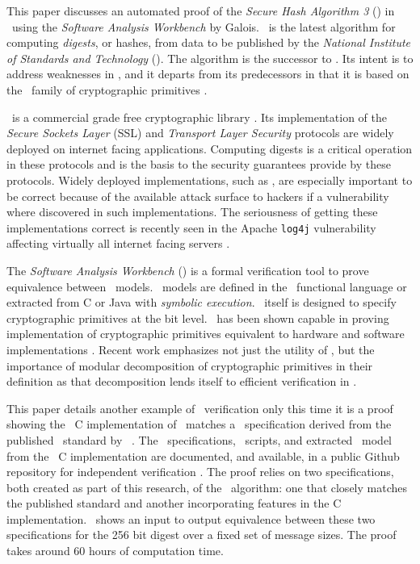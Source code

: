 This paper discusses an automated proof of the \emph{Secure Hash Algorithm 3} (\shaThree) in \openssl\ using the \emph{Software Analysis Workbench} by Galois.
\shaThree\ is the latest algorithm for computing \emph{digests}, or hashes, from data to be published by the \emph{National Institute of Standards and Technology} (\nist).
The algorithm is the successor to \shaTwo.
Its intent is to address weaknesses in \shaTwo, and it departs from its predecessors in that it is based on the \keccak\ family of cryptographic primitives \cite{fips202}.

\openssl\ is a commercial grade free cryptographic library \cite{openssl}.
Its implementation of the \emph{Secure Sockets Layer} (SSL) and \emph{Transport Layer Security} protocols are widely deployed on internet facing applications.
Computing digests is a critical operation in these protocols and is the basis to the security guarantees provide by these protocols.
Widely deployed implementations, such as \openssl, are especially important to be correct because of the available attack surface to hackers if a vulnerability where discovered in such implementations.
The seriousness of getting these implementations correct is recently seen in the Apache \texttt{log4j} vulnerability affecting virtually all internet facing servers \cite{log4j}.

The \emph{Software Analysis Workbench} (\saw) is a formal verification tool to prove equivalence between \sawcore\ models. \sawcore\ models are defined in the \cryptol\ functional language or extracted from C or Java with \emph{symbolic execution}.
\cryptol\ itself is designed to specify cryptographic primitives at the bit level.
\saw\ has been shown capable in proving implementation of cryptographic primitives equivalent to hardware and software implementations \cite{crypt-hi,hard-soft,design-verif}.
Recent work emphasizes not just the utility of \saw, but the importance of modular decomposition of cryptographic primitives in their definition as that decomposition lends itself to efficient verification in \saw \cite{nfm-us}. 

This paper details another example of \saw\ verification only this time it is a proof showing the \openssl\ C implementation of \shaThree\ matches a \cryptol\ specification derived from the published \fips\ standard by \nist\ \cite{fips202}.
The \cryptol\ specifications, \saw\ scripts, and extracted \sawcore\ model from the \openssl\ C implementation are documented, and available, in a public Github repository for independent verification \cite{repo}.
The proof relies on two specifications, both created as part of this research, of the \shaThree\ algorithm: one that closely matches the published standard and another incorporating features in the C implementation.
\saw\ shows an input to output equivalence between these two specifications for the 256 bit digest over a fixed set of message sizes. The proof takes around 60 hours of computation time.

